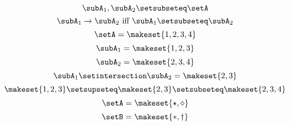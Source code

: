 {\begin{forslides}
\begin{equation}
        \subA_1, \subA_2 \setsubseteq \setA
    \end{equation}
    \begin{equation}
        \label{eq:prod-slides-15}
        \subA_1 \to \subA_2 \text{ iff } \subA_1 \setsubseteq \subA_2
    \end{equation}
    \begin{equation}
        \label{eq:prod-slides-16}
        \setA = \makeset{ 1, 2, 3, 4 }
    \end{equation}
    \begin{equation}
        \label{eq:prod-slides-17}
        \subA_1 = \makeset{ 1, 2, 3 }
    \end{equation}
    \begin{equation}
        \label{eq:prod-slides-18}
        \subA_2 = \makeset{2, 3, 4 }
    \end{equation}
    \begin{equation}
        \label{eq:prod-slides-19}
        \subA_1 \setintersection \subA_2 = \makeset{2, 3 }
    \end{equation}
    \begin{equation}
        \label{eq:prod-slides-20}
        \makeset{ 1, 2, 3 } \setsupseteq \makeset{2, 3 } \setsubseteq \makeset{2, 3, 4 }
    \end{equation}
    \begin{equation}
        \label{eq:coprod-slides-1}
        \setA=\makeset{\star, \diamond}
    \end{equation}
    \begin{equation}
        \label{eq:coprod-slides-2}
        \setB=\makeset{\ast, \dagger}
    \end{equation}

\end{forslides}

}